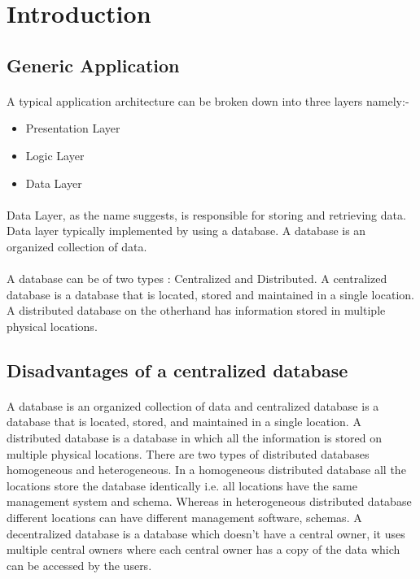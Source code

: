 \documentclass{article}
\begin{document}
\section{Introduction}
    \subsection{Generic Application}
        \paragraph{} A typical application architecture can be broken down into three layers namely:-
        \vspace{-1.5em}
        \begin{itemize}
            \item Presentation Layer
            \item Logic Layer
            \item Data Layer
        \end{itemize}

        \paragraph{} Data Layer, as the name suggests, is responsible for storing and retrieving data. Data layer typically implemented by using a database. A database is an organized collection of data.
        
        \paragraph{} A database can be of two types : Centralized and Distributed. A centralized database is a database that is located, stored and maintained in a single location.\cite{wiki} A distributed database on the otherhand has information  stored in multiple physical locations.
        
    \subsection{Disadvantages of a centralized database}
        \paragraph{}
        A database is an organized collection of data and centralized database is a database that is located, stored, and maintained in a single location.
        A distributed database is a database in which all the information is stored on multiple physical locations. There are two types of distributed databases homogeneous and heterogeneous. In a homogeneous distributed database all the locations store the database identically i.e. all locations have the same management system and schema. Whereas in heterogeneous distributed database different locations can have different management software, schemas.
        A decentralized database is a database which doesn't have a central owner, it uses multiple central owners where each central owner has a copy of the data which can be accessed by the users. 
        \cite{wiki}
\end{document}
